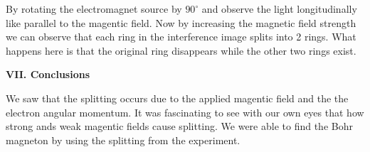 \documentclass[fleqn]{article}
\begin{document}
  By rotating the electromagnet source by $90^{\circ}$ and observe the light longitudinally like parallel to the magentic field. Now by 
  increasing the magnetic field strength we can observe that each ring in the interference image splits into 2 rings. What happens here 
  is that the original ring disappears while the other two rings exist.


  \vspace{20px}

  \textbf{VII. Conclusions}

  \vspace{10px}

  We saw that the splitting occurs due to the applied magentic field and the the electron angular momentum. It was fascinating
  to see with our own eyes that how strong ands weak magentic fields cause splitting. We were able to find the Bohr magneton by using the 
  splitting from the experiment. 

  \printbibliography
\end{document}
